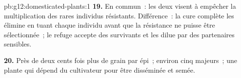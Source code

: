 \begin{solution}{pb:g12:domesticated-plants:1}
\textbf{19.} En commun~: les deux visent à empêcher la multiplication
des rares individus résistants. Différence~: la cure complète les
élimine en tuant chaque individu avant que la résistance ne puisse
être sélectionnée~; le refuge accepte des survivants et les dilue par
des partenaires sensibles.

\textbf{20.} Près de deux cents fois plus de grain par épi~; environ
cinq  majeurs~; une plante qui dépend du cultivateur pour être
disséminée et semée.
\end{solution}
